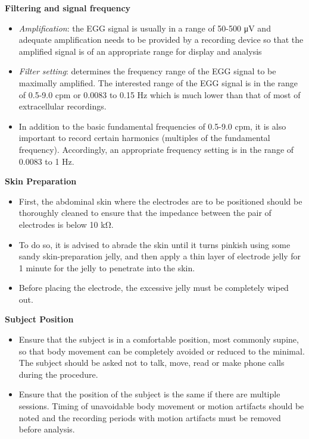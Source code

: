 \documentclass[]{book}
\providecommand{\tightlist}{%
  \setlength{\itemsep}{0pt}\setlength{\parskip}{0pt}}
\begin{document}
\textbf{Filtering and signal frequency}

\begin{itemize}
\tightlist
\item
  \emph{Amplification}: the EGG signal is usually in a range of 50-500
  μV and adequate amplification needs to be provided by a recording
  device so that the amplified signal is of an appropriate range for
  display and analysis
\item
  \emph{Filter setting}: determines the frequency range of the EGG
  signal to be maximally amplified. The interested range of the EGG
  signal is in the range of 0.5-9.0 cpm or 0.0083 to 0.15 Hz which is
  much lower than that of most of extracellular recordings.
\item
  In addition to the basic fundamental frequencies of 0.5-9.0 cpm, it is
  also important to record certain harmonics (multiples of the
  fundamental frequency). Accordingly, an appropriate frequency setting
  is in the range of 0.0083 to 1 Hz.
\end{itemize}

\textbf{Skin Preparation}

\begin{itemize}
\tightlist
\item
  First, the abdominal skin where the electrodes are to be positioned
  should be thoroughly cleaned to ensure that the impedance between the
  pair of electrodes is below 10 kΩ.
\item
  To do so, it is advised to abrade the skin until it turns pinkish
  using some sandy skin-preparation jelly, and then apply a thin layer
  of electrode jelly for 1 minute for the jelly to penetrate into the
  skin.
\item
  Before placing the electrode, the excessive jelly must be completely
  wiped out.
\end{itemize}

\textbf{Subject Position}

\begin{itemize}
\tightlist
\item
  Ensure that the subject is in a comfortable position, most commonly
  supine, so that body movement can be completely avoided or reduced to
  the minimal. The subject should be asked not to talk, move, read or
  make phone calls during the procedure.
\item
  Ensure that the position of the subject is the same if there are
  multiple sessions. Timing of unavoidable body movement or motion
  artifacts should be noted and the recording periods with motion
  artifacts must be removed before analysis.
\end{itemize}
\end{document}
